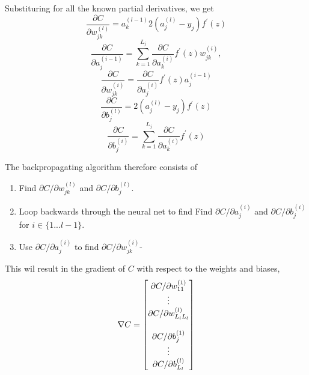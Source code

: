 Substituring for all the known partial derivatives, we get
$$
    \frac{\partial C}{\partial w^{(l)}_{jk}} = a^{(l - 1)}_k 2(a^{(l)}_{j} - y_j) f^\prime (z)
$$
$$
    \frac{\partial C}{\partial a^{(i - 1)}_{j}} = \sum_{k = 1}^{L_j}\frac{\partial C}{\partial a^{(i)}_{k}} 
    f^\prime (z) w^{(i)}_{jk},
$$
$$
    \frac{\partial C}{\partial w^{(i)}_{jk}} = \frac{\partial C}{\partial a^{(i)}_{j}} f^\prime (z)a^{(i-1)}_{j}
$$
$$
    \frac{\partial C}{\partial b^{(l)}_{j}} = 2(a^{(l)}_{j} - y_j) f^\prime (z)
$$
$$
    \frac{\partial C}{\partial b^{(i)}_{j}} = \sum_{k = 1}^{L_j}\frac{\partial C}{\partial a^{(i)}_{k}} 
    f^\prime (z) 
$$

The backpropagating algorithm therefore consists of 
\begin{enumerate}
    \item Find $\partial C / \partial w^{(l)}_{jk}$ and $\partial C / \partial b^{(l)}_{j}$.
    \item Loop backwards through the neural net to find Find $\partial C / \partial a^{(i)}_{j}$ and $\partial C / \partial b^{(i)}_{j}$ for $i \in \{1 ... l-1 \}$.
    \item Use $\partial C / \partial a^{(i)}_{j}$ to find $\partial C / \partial w^{(i)}_{jk}$-
\end{enumerate}
This wil result in the gradient of $C$ with respect to the weights and biases, 
$$
    \nabla C =
    \begin{bmatrix}
        \partial C / \partial w^{(1)}_{11} \\
        \vdots \\
        \partial C/\partial w^{(l)}_{L_lL_l} \\
        \vspace{1px}\\
        \partial C/\partial b^{(1)}_{j} \\
        \vdots \\
        \partial C /\partial b^{(l)}_{L_l} \\
    \end{bmatrix}
$$
